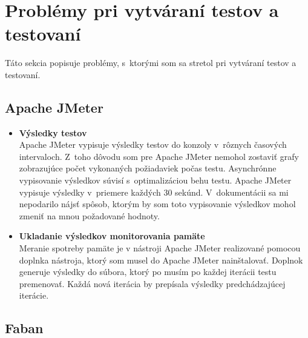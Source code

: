 \documentclass[12pt,oneside,final]{fithesis-utf8}
\begin{document}
\section{Problémy pri vytváraní testov a testovaní}
Táto sekcia popisuje problémy, s~ktorými som sa stretol pri vytváraní testov a testovaní.

\subsection{Apache JMeter}

\begin{itemize}

\item \textbf{Výsledky testov}\\
Apache JMeter vypisuje výsledky testov do konzoly v~rôznych časových intervaloch. Z~toho dôvodu som pre Apache JMeter nemohol zostaviť grafy zobrazujúce počet vykonaných požiadaviek počas testu. Asynchrónne vypisovanie výsledkov súvisí s~optimalizáciou behu testu. Apache JMeter vypisuje výsledky v~priemere každých 30 sekúnd. V~dokumentácii sa mi nepodarilo nájsť spôsob, ktorým by som toto vypisovanie výsledkov mohol zmeniť na mnou požadované hodnoty.

\item \textbf{Ukladanie výsledkov monitorovania pamäte}\\
Meranie spotreby pamäte je v nástroji Apache JMeter realizované pomocou doplnka nástroja, ktorý som musel do Apache JMeter nainštalovať. Doplnok generuje výsledky do súbora, ktorý po musím po každej iterácii testu premenovať. Každá nová iterácia by prepísala výsledky predchádzajúcej iterácie.

\end{itemize}

\subsection{Faban}
\end{document}
